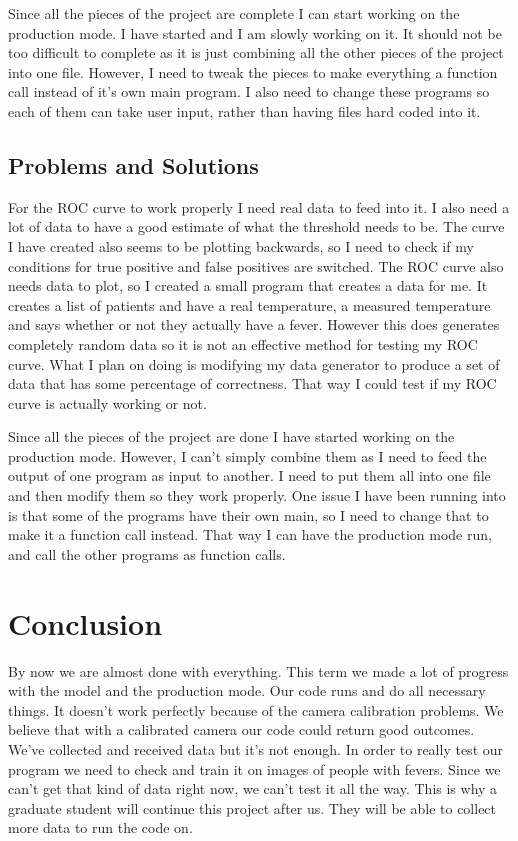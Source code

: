 \documentclass[onecolumn, draftclsnofoot,10pt, compsoc]{IEEEtran}
\begin{document}
Since all the pieces of the project are complete I can start working on the production mode. I have started and I am slowly working on it. It should not be too difficult to complete as it is just combining all the other pieces of the project into one file. However, I need to tweak the pieces to make everything a function call instead of it’s own main program. I also need to change these programs so each of them can take user input, rather than having files hard coded into it.

\subsection{Problems and Solutions}

For the ROC curve to work properly I need real data to feed into it. I also need a lot of data to have a good estimate of what the threshold needs to be. The curve I have created also seems to be plotting backwards, so I need to check if my conditions for true positive and false positives are switched. The ROC curve also needs data to plot, so I created a small program that creates a data for me. It creates a list of patients and have a real temperature, a measured temperature and says whether or not they actually have a fever. However this does generates completely random data so it is not an effective method for testing my ROC curve. What I plan on doing is modifying my data generator to produce a set of data that has some percentage of correctness. That way I could test if my ROC curve is actually working or not.

Since all the pieces of the project are done I have started working on the production mode. However, I can’t simply combine them as I need to feed the output of one program as input to another. I need to put them all into one file and then modify them so they work properly. One issue I have been running into is that some of the programs have their own main, so I need to change that to make it a function call instead. That way I can have the production mode run, and call the other programs as function calls.

\section{Conclusion}


By now we are almost done with everything. This term we made a lot of progress with the model and the production mode. Our code runs and do all necessary things. It doesn’t work perfectly because of the camera calibration problems. We believe that with a calibrated camera our code could return good outcomes. We’ve collected and received data but it’s not enough. In order to really test our program we need to check and train it on images of people with fevers. Since we can’t get that kind of data right now, we can’t test it all the way. This is why a graduate student will continue this project after us. They will be able to collect more data to run the code on. 








\end{document}
